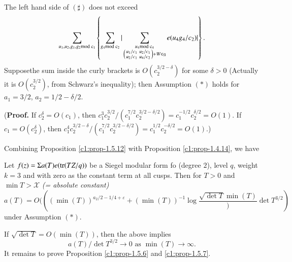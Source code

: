 The left hand side of $(\sharp)$ does not exceed
$$
\sum_{u_{1},u_{2},g_{1},g_{2}\rm{mod} \; c_{1}}\left\{\sum_{g_{4}\rm{mod} \;
  c_{2}}|\sum_{\substack{u_{4}\rm{mod} \; c_{4}\\ \left(\begin{smallmatrix}
      u_{1}/c_{1} & u_{2}/c_{1}\\ u_{2}/c_{1} & u_{4}/c_{2}
    \end{smallmatrix}\right)+W\in\mathfrak{g}}}e(u_{4}g_{4}/c_{2})|\right\}.
$$
Suppose\pageoriginale the sum inside the curly brackets is
$O(c^{3/2-\delta}_{2})$ 
for some $\delta>0$ (Actually it is $O(c^{3/2}_{2})$, from Schwarz's
inequality); then Assumption $(\ast)$ holds for $a_{1}=3/2$,
$a_{2}=1/2-\delta/2$. 

({\bf Proof.} If $c^{\delta}_{2}=O(c_{1})$, then
$c^{3}_{1}c^{3/2}_{2}/(c^{7/2}_{1}c_{2}^{3/2-\delta/2})=c^{-1/2}_{1}c^{\delta/2}_{2}=O(1)$. If
$c_{1}=O(c^{\delta}_{2})$, then $c^{4}_{1}c^{3/2-\delta}_{2}/(c^{7/2}_{1}c^{3/2-\delta/2}_{2})=c^{1/2}_{1}c^{-\delta/2}_{2}=O(1)$.)

Combining Proposition \ref{c1:prop-1.5.12} with Proposition
\ref{c1:prop-1.4.14}, we have

\setcounter{subtheorem}{12}
\begin{subtheorem}\label{c1:thm-1.5.13}
Let $f(z)=\Sigma a(T)e(\operatorname{tr}(TZ/q))$ be a Siegel modular form fo (degree
$2$), level $q$, weight $k=3$ and with zero as the constant term at
all cusps. Then for $T>0$ and $\min T>\mathscr{X}$ {\em (= absolute
  constant)} 
$$
a(T)=O(((\min
(T))^{a_{2}/2-1/4+\varepsilon}+(\min(T))^{-1}\log\frac{\sqrt{\det
    T}{\min(T)}})\det T^{3/2}) 
$$
under Assumption $(\ast)$.
\end{subtheorem}

\begin{remark*}
If $\sqrt{\det T}=O(\min(T))$, then the above implies 
$$
a(T)/\det T^{3/2}\to 0\text{ \ as \ } \min(T)\to \infty.
$$
It remains to prove Proposition \ref{c1:prop-1.5.6} and
\ref{c1:prop-1.5.7}. 
\end{remark*}

